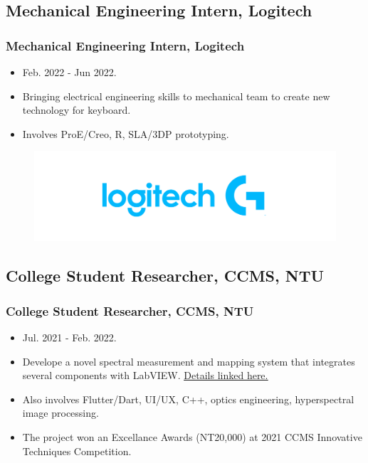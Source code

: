 \documentclass[compress, aspectratio=32]{beamer}
\begin{document}
\subsection{Mechanical Engineering Intern, Logitech}
\begin{frame}
    \frametitle{Mechanical Engineering Intern, Logitech}
    \begin{itemize}
        \item Feb. 2022 - Jun 2022.
        \item Bringing electrical engineering skills to mechanical team to create new technology for keyboard.
        \item Involves ProE/Creo, R, SLA/3DP prototyping.
    \end{itemize}
    \begin{figure}
        \centering
        \includegraphics[width = 0.5\linewidth]{High_Resolution_JPEG-LogitechG_horz_RGB_cyan_LG.jpg}
    \end{figure}
\end{frame}

\subsection{College Student Researcher, CCMS, NTU}
\begin{frame}
    \frametitle{College Student Researcher, CCMS, NTU}
    \begin{itemize}
        \item Jul. 2021 - Feb. 2022.
        \item Develope a novel spectral measurement and mapping system that integrates several components with LabVIEW. \href{https://bencer3283.github.io/experiences/collegeStudentResearch/}{\underline{Details linked here.}}
        \item Also involves Flutter/Dart, UI/UX, C++, optics engineering, hyperspectral image processing.
        \item The project won an Excellance Awards (NT20,000) at 2021 CCMS Innovative Techniques Competition.
    \end{itemize}
\end{frame}
\end{document}
